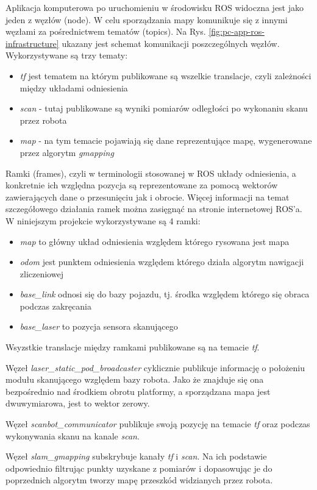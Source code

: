 Aplikacja komputerowa po uruchomieniu w środowisku ROS widoczna jest jako jeden z węzłów (node). W celu sporządzania mapy komunikuje się z innymi węzłami za pośrednictwem tematów (topics).
Na Rys. \ref{fig:pc-app-ros-infrastructure} ukazany jest schemat komunikacji poszczególnych węzłów.
Wykorzystywane są trzy tematy:
\begin{itemize}
    \item \emph{tf} jest tematem na którym publikowane są wszelkie translacje, czyli zależności między układami odniesienia
    \item \emph{scan} - tutaj publikowane są wyniki pomiarów odległości po wykonaniu skanu przez robota
    \item \emph{map} - na tym temacie pojawiają się dane reprezentujące mapę, wygenerowane przez algorytm \emph{gmapping}\cite{Grisetti2005}\cite{gmapping-website}\cite{gmapping-ros}
\end{itemize}

Ramki (frames), czyli w terminologii stosowanej w ROS układy odniesienia, a konkretnie ich względna pozycja są reprezentowane za pomocą wektorów zawierających dane o przesunięciu jak i obrocie. Więcej informacji na temat szczegółowego działania ramek można zasięgnąć na stronie internetowej ROS'a\cite{ros}. W niniejszym projekcie wykorzystywane są 4 ramki:
\begin{itemize}
    \item \emph{map} to główny układ odniesienia względem którego rysowana jest mapa
    \item \emph{odom} jest punktem odniesienia względem którego działa algorytm nawigacji zliczeniowej
    \item \emph{base\_link} odnosi się do bazy pojazdu, tj. środka względem którego się obraca podczas zakręcania
    \item \emph{base\_laser} to pozycja sensora skanującego
\end{itemize}
Wsyzstkie translacje między ramkami publikowane są na temacie \emph{tf}.

Węzeł \emph{laser\_static\_pod\_broadcaster} cyklicznie publikuje informację o położeniu modułu skanującego względem bazy robota. Jako że znajduje się ona bezpośrednio nad środkiem obrotu platformy, a sporządzana mapa jest dwuwymiarowa, jest to wektor zerowy.

Węzeł \emph{scanbot\_communicator} publikuje swoją pozycję na temacie \emph{tf} oraz podczas wykonywania skanu na kanale \emph{scan}.

Węzeł \emph{slam\_gmapping} subskrybuje kanały \emph{tf} i \emph{scan}. Na ich podstawie odpowiednio filtrując punkty uzyskane z pomiarów i dopasowując je do poprzednich algorytm tworzy mapę przeszkód widzianych przez robota.

